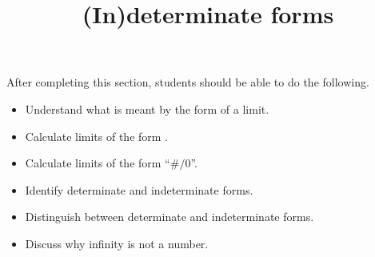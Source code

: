\documentclass{ximera}
\title{(In)determinate forms}
\begin{document}
\begin{abstract}
\end{abstract}
\maketitle

\begin{sectionOutcomes}
After completing this section, students should be able to do the following.

\begin{itemize}
\item Understand what is meant by the form of a limit.
\item Calculate limits of the form \zeroOverZero.
\item Calculate limits of the form ``$\#/0$''.
\item Identify determinate and indeterminate forms.
\item Distinguish between determinate and indeterminate forms.
\item Discuss why infinity is not a number.
\end{itemize}
\end{sectionOutcomes}
\end{document}
